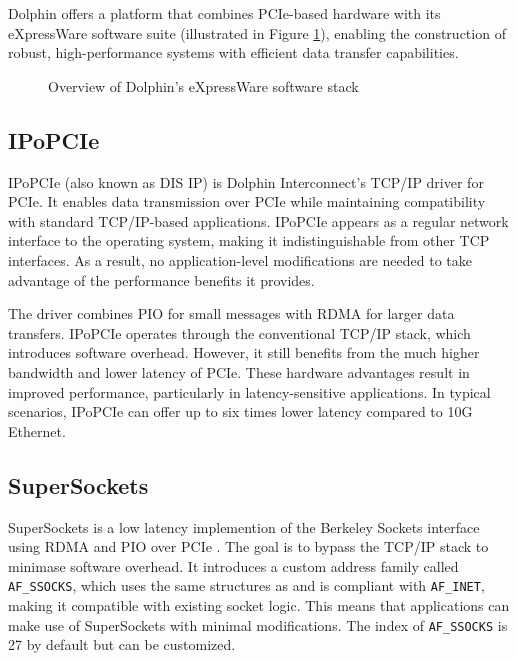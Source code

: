 Dolphin offers a platform that combines PCIe-based hardware with its eXpressWare software suite (illustrated in Figure \ref{fig:dolphin_stack}), enabling the construction of robust, high-performance systems with efficient data transfer capabilities.\cite{dolphinics2025}

\begin{figure}[H]
    \centering
    
    \caption[eXpressWare Stack]{Overview of Dolphin’s eXpressWare software stack}

    \label{fig:dolphin_stack}
\end{figure}
\subsection{IPoPCIe}

IPoPCIe (also known as DIS IP) is Dolphin Interconnect's TCP/IP driver for PCIe. It enables data transmission over PCIe while maintaining compatibility with standard TCP/IP-based applications. IPoPCIe appears as a regular network interface to the operating system, making it indistinguishable from other TCP interfaces. As a result, no application-level modifications are needed to take advantage of the performance benefits it provides.

The driver combines PIO for small messages with RDMA for larger data transfers. IPoPCIe operates through the conventional TCP/IP stack, which introduces software overhead. However, it still benefits from the much higher bandwidth and lower latency of PCIe. These hardware advantages result in improved performance, particularly in latency-sensitive applications. In typical scenarios, IPoPCIe can offer up to six times lower latency compared to 10G Ethernet. \cite{dolphin_fast_tcp_udp_ip}

\subsection{SuperSockets}

SuperSockets is a low latency implemention of the Berkeley Sockets interface using RDMA and PIO over PCIe \cite{seifert2004scisocket}. The goal is to bypass the TCP/IP stack to minimase software overhead. It introduces a custom address family called \texttt{AF\_SSOCKS}, which uses the same structures as and is compliant with \texttt{AF\_INET}, making it compatible with existing socket logic. This means that applications can make use of SuperSockets with minimal modifications. The index of \texttt{AF\_SSOCKS} is 27 by default but can be customized.

